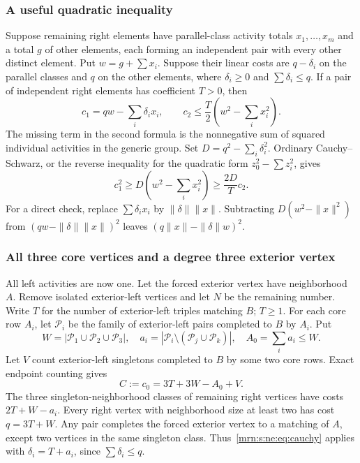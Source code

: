 \documentclass[11pt,a4paper]{article}
\theoremstyle{remark}\newtheorem{remark}[theorem]{Remark}
\begin{document}
\subsubsection{A useful quadratic inequality}
Suppose remaining right elements have parallel-class activity totals $x_1,\ldots,x_m$ and a total $g$ of other elements, each forming an independent pair with every other distinct element. Put $w=g+\sum x_i$. Suppose their linear costs are $q-\delta_i$ on the parallel classes and $q$ on the other elements, where $\delta_i\ge0$ and $\sum\delta_i\le q$. If a pair of independent right elements has coefficient $T>0$, then
\[
 c_1=qw-\sum_i\delta_ix_i,\qquad
 c_2\le\frac{T}{2}\left(w^2-\sum_ix_i^2\right).
\]
The missing term in the second formula is the nonnegative sum of squared individual activities in the generic group. Set $D=q^2-\sum_i\delta_i^2$. Ordinary Cauchy--Schwarz, or the reverse inequality for the quadratic form $z_0^2-\sum z_i^2$, gives
\begin{equation}\label{mrn:s:ne:eq:cauchy}
 c_1^2\ge D\left(w^2-\sum_ix_i^2\right)\ge\frac{2D}{T}c_2.
\end{equation}
For a direct check, replace $\sum\delta_ix_i$ by $\|\delta\|\|x\|$. Subtracting $D(w^2-\|x\|^2)$ from $(qw-\|\delta\|\|x\|)^2$ leaves $(q\|x\|-\|\delta\|w)^2$.

\subsubsection{All three core vertices and a degree three exterior vertex}
All left activities are now one. Let the forced exterior vertex have neighborhood $A$. Remove isolated exterior-left vertices and let $N$ be the remaining number. Write $T$ for the number of exterior-left triples matching $B$; $T\ge1$. For each core row $A_i$, let $\mathcal P_i$ be the family of exterior-left pairs completed to $B$ by $A_i$. Put
\[
 W=|\mathcal P_1\cup\mathcal P_2\cup\mathcal P_3|,
 \quad a_i=|\mathcal P_i\setminus(\mathcal P_j\cup\mathcal P_k)|,
 \quad A_0=\sum_i a_i\le W.
\]
Let $V$ count exterior-left singletons completed to $B$ by some two core rows. Exact endpoint counting gives
\[
 C:=c_0=3T+3W-A_0+V.
\]
The three singleton-neighborhood classes of remaining right vertices have costs $2T+W-a_i$. Every right vertex with neighborhood size at least two has cost $q=3T+W$. Any pair completes the forced exterior vertex to a matching of $A$, except two vertices in the same singleton class. Thus~\eqref{mrn:s:ne:eq:cauchy} applies with $\delta_i=T+a_i$, since $\sum\delta_i\le q$.
\end{document}
